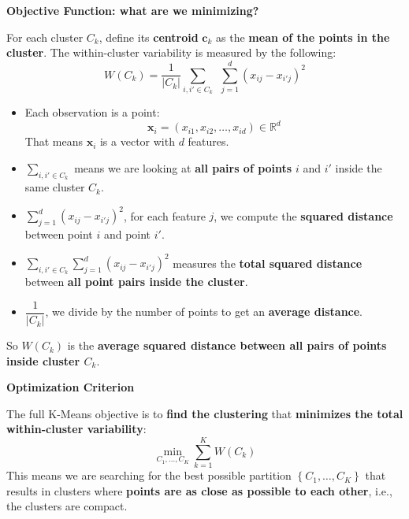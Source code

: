 \highspace
\begin{flushleft}
    \textcolor{Green3}{ \textbf{Objective Function: what are we minimizing?}}
\end{flushleft}
For each cluster $C_{k}$, define its \textbf{centroid} $\mathbf{c}_{k}$ as the \textbf{mean of the points in the cluster}. The within-cluster variability is measured by the following:
\begin{equation}
    W\left(C_{k}\right) = \dfrac{1}{\left|C_{k}\right|} \displaystyle\sum_{i, i' \in C_k} \:\: \sum_{j=1}^{d} \left(x_{ij} - x_{i'j}\right)^{2}
\end{equation}
\begin{itemize}
    \item Each observation is a point:
    \begin{equation*}
        \mathbf{x}_{i} = \left(x_{i1}, x_{i2}, \dots, x_{id}\right) \in \mathbb{R}^{d}
    \end{equation*}
    That means $\mathbf{x}_{i}$ is a vector with $d$ features.

    \item $\displaystyle\sum_{i, i' \in C_k}$ means we are looking at \textbf{all pairs of points} $i$ and $i'$ inside the same cluster $C_{k}$.
    
    \item $\displaystyle \sum_{j=1}^{d} \left(x_{ij} - x_{i'j}\right)^{2}$, for each feature $j$, we compute the \textbf{squared distance} between point $i$ and point $i'$.

    \item $\displaystyle\sum_{i, i' \in C_k} \displaystyle \sum_{j=1}^{d} \left(x_{ij} - x_{i'j}\right)^{2}$ measures the \textbf{total squared distance} between \textbf{all point pairs inside the cluster}.

    \item $\dfrac{1}{\left|C_{k}\right|}$, we divide by the number of points to get an \textbf{average distance}.
\end{itemize}
So $W\left(C_{k}\right)$ is the \textbf{average squared distance between all pairs of points inside cluster $C_{k}$}.

\highspace
\begin{flushleft}
    \textcolor{Green3}{\faIcon{\speedIcon} \textbf{Optimization Criterion}}
\end{flushleft}
The full K-Means objective is to \textbf{find the clustering} that \textbf{minimizes the total within-cluster variability}:
\begin{equation}
    \min_{C_{1}, \dots, C_{K}} \displaystyle\sum_{k=1}^{K} W\left(C_{k}\right)
\end{equation}
This means we are searching for the best possible partition $\left\{C_{1}, \dots, C_{K}\right\}$ that results in clusters where \textbf{points are as close as possible to each other}, i.e., the clusters are compact.

